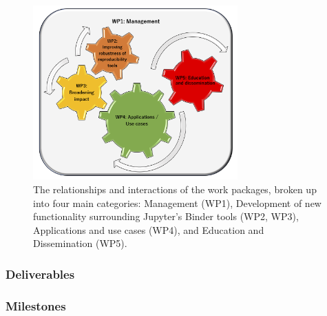 \begin{figure}[htb]
  \centering
  \includegraphics[width=0.7\textwidth]{images/WP_low.png}
  \caption{
    \label{fig:workpackages}
    The relationships and interactions of the work packages,
    broken up into four main categories: Management (WP1),
    Development of new functionality surrounding Jupyter's Binder tools (WP2, WP3),
    Applications and use cases (WP4),
    and Education and Dissemination (WP5).
  }
\end{figure}


\ganttchart[draft,xscale=.33,milestones]

\ifgrantagreement\else
\newpage
\subsubsection{Deliverables}\label{sec:deliverables}
\fi


\newpage
\subsubsection{Milestones}\label{sec:milestones}









